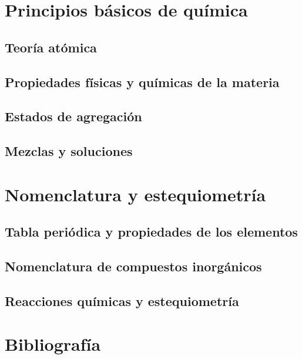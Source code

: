 \documentclass{AsignaturaDiapositivas}
\begin{document}
\Portada



    \section{Principios básicos de química}

\subsection{Teoría atómica}
\subsection{Propiedades físicas y químicas de la materia}
\subsection{Estados de agregación}
\subsection{Mezclas y soluciones}


    \section{Nomenclatura y estequiometría}

\subsection{Tabla periódica y propiedades de los elementos}
\subsection{Nomenclatura de compuestos inorgánicos}
\subsection{Reacciones químicas y estequiometría}




\section{Bibliografía}\begin{frame}\end{frame}
\end{document}
